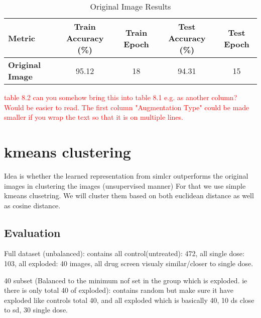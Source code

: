         \begin{table}[h!]
            \centering
            \caption{Original Image Results}
            \label{tab:original_image_results}
            \begin{tabular}{lcccc}
            \toprule
            \textbf{Metric}         & \textbf{Train Accuracy (\%)} & \textbf{Train Epoch} & \textbf{Test Accuracy (\%)} & \textbf{Test Epoch} \\ \midrule
            \textbf{Original Image} & 95.12                        & 18                   & 94.31                        & 15                  \\ 
            \bottomrule
            \end{tabular}
        \end{table}
            




\textcolor{red}{table 8.2 can you somehow bring this into table 8.1 e.g. as another column? Would be easier to read. The first column 
"Augmentation Type" could be made smaller if you wrap the text so that it is on multiple lines.} 






\section{kmeans clustering}

Idea is whether the learned representation from simlcr outperforms the original images in clustering the images (unsupervised manner) For that we use simple kmeans 
clusetring. We will cluster them based on both euclidean distance as well as cosine distance.





\subsection{Evaluation}

Full dataset (unbalanced): contains all control(untreated): 472, all single dose: 103, all exploded: 40 images, all drug screen visualy similar/closer to single dose.

40 subset (Balanced to the minimum nof set in the group which is exploded. ie there is only total 40 of exploded): contains random but make sure it have exploded like 
controls total 40, and all exploded which is basically 40, 10 ds close to sd, 30 single dose.

